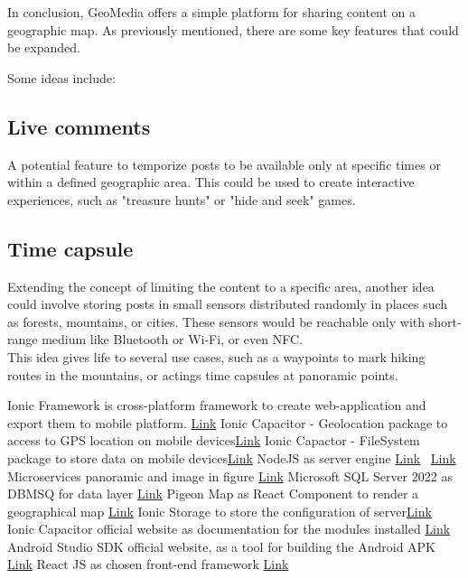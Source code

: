 \documentclass[conference]{IEEEtran}
\begin{document}
In conclusion, GeoMedia offers a simple platform for sharing content on a geographic map. As previously mentioned, there are some key features that could be expanded.

Some ideas include:

\subsection{Live comments}
A potential feature to temporize posts to be available only at specific times or within a defined geographic area.
This could be used to create interactive experiences, such as "treasure hunts" or "hide and seek" games.

\subsection{Time capsule}

Extending the concept of limiting the content to a specific area, another idea could involve storing posts in small sensors distributed randomly in places such as forests, mountains, or cities. 
These sensors would be reachable only with short-range medium like Bluetooth or Wi-Fi, or even NFC.
\\
This idea gives life to several use cases, such as a waypoints to mark hiking routes in the mountains, or actings time capsules at panoramic points.


\begin{thebibliography}{00}
 Ionic Framework is cross-platform framework to create web-application and export them to mobile platform. \href{http://www.overleaf.com}{Link}
 Ionic Capacitor - Geolocation package to access to GPS location on mobile devices\href{https://capacitorjs.com/docs/apis/geolocation}{Link}
Ionic Capactor - FileSystem package to store data on mobile devices\href{https://capacitorjs.com/docs/apis/filesystem}{Link}
 NodeJS as server engine \href{https://nodejs.org/en}{Link}\
 \href{https://tediousjs.github.io/tedious/}{Link}
\bibitem{b6} Microservices panoramic and image in figure \href{https://medium.com/the-modern-scientist/introduction-to-microservices-architecture-f0c7eefe79f1}{Link}
\bibitem{b7} Microsoft SQL Server 2022 as DBMSQ for data layer \href{https://www.microsoft.com/en-us/sql-server/sql-server-2022}{Link}
\bibitem{b8} Pigeon Map as React Component to render a geographical map \href{https://pigeon-maps.js.org/}{Link}
\bibitem{b9}Ionic Storage to store the configuration of server\href{https://ionicframework.com/docs/react/storage}{Link}
\bibitem{b10}Ionic Capacitor official website as documentation for the modules installed \href{https://capacitorjs.com/}{Link}
\bibitem{b11}Android Studio SDK official website, as a tool for building the Android APK \href{https://developer.android.com/studio} {Link}
\bibitem{b12}React JS as chosen front-end framework \href{https://react.dev/}{Link}
\end{thebibliography}

\vspace{12pt}
\end{document}
